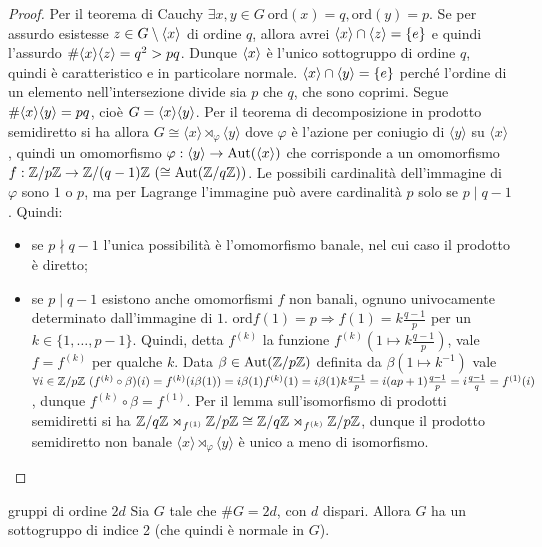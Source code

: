 \begin{proof}
    Per il teorema di Cauchy $\exists x,y \in G \ \text{ord}(x) = q, \text{ord}(y) = p$. Se per assurdo esistesse $z \in G \setminus \langle x \rangle$ di ordine $q$, allora avrei $\langle x \rangle \cap \langle z \rangle = \{e\}$ e quindi l'assurdo $\# \langle x \rangle\langle z \rangle = q^2 > pq$. Dunque $\langle x \rangle$ è l'unico sottogruppo di ordine $q$, quindi è caratteristico e in particolare normale.
    $\langle x \rangle \cap \langle y \rangle = \{e\}$ perché l'ordine di un elemento nell'intersezione divide sia $p$ che $q$, che sono coprimi. Segue $\#\langle x \rangle\langle y \rangle = pq$, cioè $G = \langle x \rangle\langle y \rangle$. Per il teorema di decomposizione in prodotto semidiretto si ha allora $G \cong \langle x \rangle \rtimes_{\varphi} \langle y \rangle$ dove $\varphi$ è l'azione per coniugio di $\langle y \rangle$ su $\langle x \rangle$,
    quindi un omomorfismo $\varphi : \langle y \rangle \rightarrow \text{Aut}(\langle x \rangle)$ che corrisponde a un omomorfismo $f : \mathbb{Z}/p\mathbb{Z} \to \mathbb{Z}/(q-1)\mathbb{Z} \ (\cong \text{Aut}(\mathbb{Z}/q\mathbb{Z}))$.
    Le possibili cardinalità dell'immagine di $\varphi$ sono $1$ o $p$, ma per Lagrange l'immagine può avere cardinalità $p$ solo se $p \mid q-1$. Quindi:
    \begin{itemize}
        \item se $p \nmid q-1$ l'unica possibilità è l'omomorfismo banale, nel cui caso il prodotto è diretto;
        \item se $p \mid q-1$ esistono anche omomorfismi $f$ non banali, ognuno univocamente determinato dall'immagine di $1$. $\text{ord}f(1) = p \Rightarrow f(1) = k \frac{q-1}{p}$ per un $k \in \{1, \dots, p-1\}$. Quindi, detta $f^{(k)}$ la funzione $f^{(k)}(1 \mapsto k \frac{q-1}{p})$, vale $f = f^{(k)}$ per qualche $k$. Data $\beta \in \text{Aut}(\mathbb{Z}/p\mathbb{Z})$ definita da $\beta(1 \mapsto k^{-1})$ vale $\forall i \in \mathbb{Z}/p\mathbb{Z} \ (f^{(k)} \circ \beta)(i) = f^{(k)}(i \beta(1)) = i\beta(1)f^{(k)}(1) = i\beta(1)k\frac{q-1}{p} = i (ap + 1) \frac{q-1}{p} = i \frac{q-1}{q} = f^{(1)}(i)$, dunque $f^{(k)} \circ \beta = f^{(1)}$. Per il lemma sull'isomorfismo di prodotti semidiretti si ha $\mathbb{Z}/q\mathbb{Z} \rtimes_{f^{(1)}} \mathbb{Z}/p\mathbb{Z} \cong \mathbb{Z}/q\mathbb{Z} \rtimes_{f^{(k)}} \mathbb{Z}/p\mathbb{Z}$, dunque il prodotto semidiretto non banale $\langle x \rangle \rtimes_\varphi \langle y \rangle$ è unico a meno di isomorfismo.
    \end{itemize}
\end{proof}
\begin{proposition}{gruppi di ordine $2d$}
    Sia $G$ tale che $\#G = 2d$, con $d$ dispari. Allora $G$ ha un sottogruppo di indice 2 (che quindi è normale in $G$).
\end{proposition}
